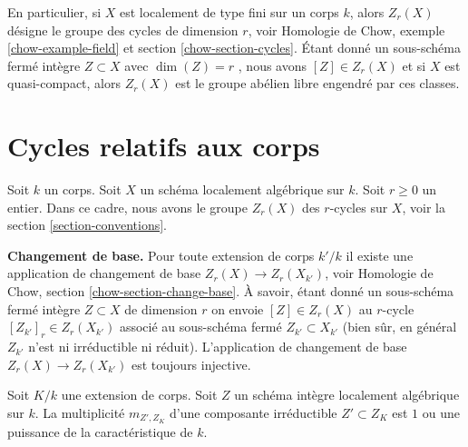 \medskip\noindent
 En particulier, si  $X$  est localement de type fini sur un corps $k$, 
alors  $Z_r(X)$  désigne le groupe des cycles de dimension $r$, voir
 Homologie de Chow, exemple  \ref{chow-example-field}  et 
section \ref{chow-section-cycles}. Étant donné un sous-schéma fermé
 intègre  $Z \subset X$  avec $\dim(Z) = r$ , nous avons  $[Z] \in Z_r(X)$
  et si  $X$  est quasi-compact, alors $Z_r(X)$ est le groupe abélien libre engendré par ces classes. 




\section{Cycles relatifs aux corps} 
\label{section-relative-fields} 

\noindent
 Soit $k$ un corps. Soit  $X$  un schéma localement algébrique sur  $k$. 
Soit  $r \geq 0$  un entier. Dans ce cadre, nous avons le groupe 
$Z_r(X)$  des  $r$-cycles sur  $X$, voir la section  \ref{section-conventions}. 

\medskip\noindent
 {\bf  Changement de base. }  Pour toute extension de corps  $k'/k$  il existe une application de changement 
de base  $Z_r(X) \to Z_r(X_{k'})$, voir
 Homologie de Chow, section  \ref{chow-section-change-base}. À 
savoir, étant donné un sous-schéma fermé intègre  $Z \subset X$
  de dimension  $r$  on envoie  $[Z] \in Z_r(X)$  au $r$-cycle  
$[Z_{k'}]_r \in Z_r(X_{k'})$  associé au sous-schéma fermé  
$Z_{k'} \subset X_{k'}$  (bien sûr, en général  $Z_{k'}$
  n’est ni irréductible ni réduit). L’application de changement de base  
$Z_r(X) \to Z_r(X_{k'})$  est toujours injective. 

\begin{lemma} 
\label{lemma-multiplicities-field-extension} 
Soit $K/k$ une extension de corps. Soit $Z$ un schéma intègre localement 
algébrique sur $k$. La multiplicité  $m_{Z', Z_K}$  d’une composante 
irréductible  $Z' \subset Z_K$  est  $1$  ou une puissance de la caractéristique de  $k$. 
\end{lemma} 


